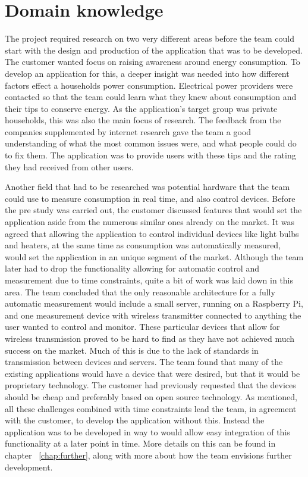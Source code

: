 \newpage
\section{Domain knowledge}
The project required research on two very different areas before the team could start with the design and production of the application that was to be developed. The customer wanted focus on raising awareness around energy consumption. To develop an application for this, a deeper insight was needed into how different factors effect a households  power consumption. Electrical power providers were contacted so that the team could learn what they knew about consumption and their tips to conserve energy. As the application's target group was private households, this was also the main focus of research. The feedback from the companies supplemented by internet research gave the team a good understanding of what the most common issues were, and what people could do to fix them. The application was to provide users with these tips and the rating they had received from other users. 

Another field that had to be researched was potential hardware that the team could use to measure consumption in real time, and also control devices. Before the pre study was carried out, the customer discussed features that would set the application aside from the numerous similar ones already on the market. It was agreed that allowing the application to control individual devices like light bulbs and heaters, at the same time as consumption was automatically measured, would set the application in an unique segment of the market. Although the team later had to drop the functionality allowing for automatic control and measurement due to time constraints, quite a bit of work was laid down in this area. The team concluded that the only reasonable architecture for a fully automatic measurement would include a small server, running on a Raspberry Pi, and one measurement device with wireless transmitter connected to anything the user wanted to control and monitor. These particular devices that allow for wireless transmission proved to be hard to find as they have not achieved much success on the market. Much of this is due to the lack of standards in transmission between devices and servers. The team found that many of the existing applications would have a device that were desired, but that it would be proprietary technology. The customer had previously requested that the devices should be cheap and preferably based on open source technology. As mentioned, all these challenges combined with time constraints lead the team, in agreement with the customer, to develop the application without  this. Instead the application was to be developed in way to would allow easy integration of this functionality at a later point in time. More details on this can be found in chapter ~\ref{chap:further}, along with more about how the team envisions further development. 